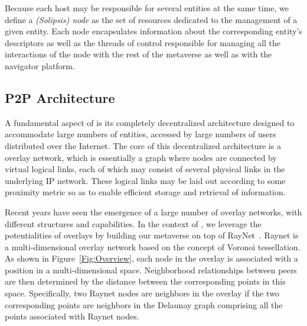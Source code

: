 Because each host may be responsible for several entities at the same
time, we define a \emph{(Solipsis) node} as the set of resources
dedicated to the management of a given entity. Each node encapsulates
information about the corresponding entity's descriptors as well as
the threads of control responsible for managing all the interactions
of the node with the rest of the \sol metaverse as well as with the
navigator platform.

\subsection{P2P Architecture}
\label{sec:p2p-architecture}
A fundamental aspect of \sol is its completely decentralized
architecture designed to accommodate large numbers of entities,
accessed by large numbers of users distributed over the Internet.  The
core of this decentralized architecture is a \ptp overlay network,
which is essentially a graph where nodes are connected by virtual
logical links, each of which may consist of several physical links in
the underlying IP network. These logical links may be laid out
according to some proximity metric so as to enable efficient storage
and retrieval of information.



Recent years have seen the emergence of a large number of \ptp overlay
networks, with different structures and capabilities.  In the context
of \sol, we leverage the potentialities of \ptp overlays by building
our metaverse on top of RayNet~\cite{beaumont}. Raynet is a
multi-dimensional overlay network based on the concept of Voronoi
tessellation. As shown in Figure~\ref{Fig:Overview}, each node in the
overlay is associated with a position in a multi-dimensional
space. Neighborhood relationships between peers are then determined by
the distance between the corresponding points in this
space. Specifically, two Raynet nodes are neighbors in the overlay if
the two corresponding points are neighbors in the Delaunay graph
comprising all the points associated with Raynet nodes.


